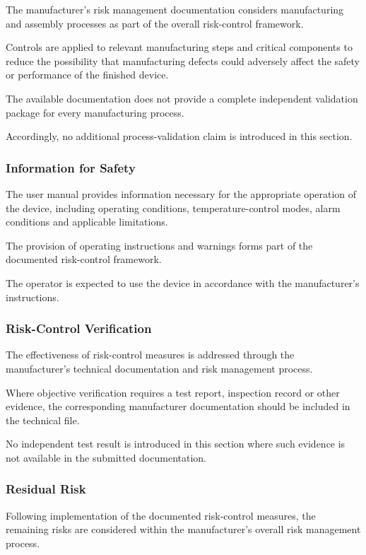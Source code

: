 The manufacturer's risk management documentation considers manufacturing
and assembly processes as part of the overall risk-control framework.

Controls are applied to relevant manufacturing steps and critical
components to reduce the possibility that manufacturing defects could
adversely affect the safety or performance of the finished device.

The available documentation does not provide a complete independent
validation package for every manufacturing process.

Accordingly, no additional process-validation claim is introduced in this
section.

\subsubsection{Information for Safety}

The user manual provides information necessary for the appropriate operation
of the device, including operating conditions, temperature-control modes,
alarm conditions and applicable limitations.

The provision of operating instructions and warnings forms part of the
documented risk-control framework.

The operator is expected to use the device in accordance with the
manufacturer's instructions.

\subsubsection{Risk-Control Verification}

The effectiveness of risk-control measures is addressed through the
manufacturer's technical documentation and risk management process.

Where objective verification requires a test report, inspection record or
other evidence, the corresponding manufacturer documentation should be
included in the technical file.

No independent test result is introduced in this section where such
evidence is not available in the submitted documentation.

\subsubsection{Residual Risk}

Following implementation of the documented risk-control measures, the
remaining risks are considered within the manufacturer's overall risk
management process.

